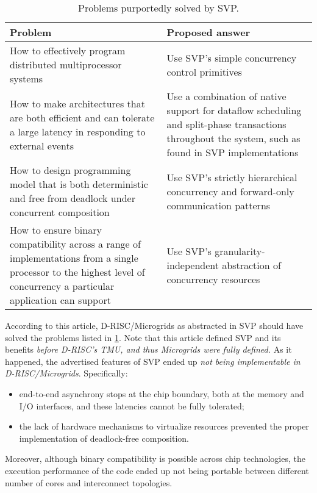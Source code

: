 \begin{table}
\begin{tabular}{p{}p{}}
Problem & Proposed answer \\
\hline \hline
How to effectively program distributed multiprocessor systems & Use SVP's simple concurrency control primitives \\
\hline
How to make architectures that are both efficient and can tolerate a large latency in responding to external events &
Use a combination of native support for dataflow scheduling and split-phase transactions throughout the system, such as found
 in SVP implementations \\
\hline
How to design programming model that is both deterministic and free from deadlock under concurrent composition & Use SVP's strictly
hierarchical concurrency and forward-only communication patterns \\
\hline
How to ensure binary compatibility across a range of implementations from a single processor to the highest level of concurrency a particular application can support & Use SVP's granularity-independent abstraction of concurrency resources \\
\end{tabular}
\caption{Problems purportedly solved by SVP.}\label{tab:mgprob}
\end{table}

According to this article, D-RISC/Microgrids as abstracted in SVP
should have solved the problems listed in \cref{tab:mgprob}. 
Note that this article defined SVP and its benefits \emph{before D-RISC's TMU, and thus Microgrids were fully defined.} 
As it happened, the advertised features of SVP 
ended up \emph{not being implementable in D-RISC/Microgrids}. Specifically:

\begin{itemize}
\item end-to-end asynchrony stops at the chip boundary, both at
the memory and I/O interfaces, and these latencies cannot be fully
tolerated;
\item the lack of hardware mechanisms to virtualize resources prevented the
proper implementation of deadlock-free composition.
\end{itemize}

Moreover, although binary compatibility is possible across chip
technologies, the execution performance of the code ended up not being
portable between different number of cores and interconnect
topologies. 

